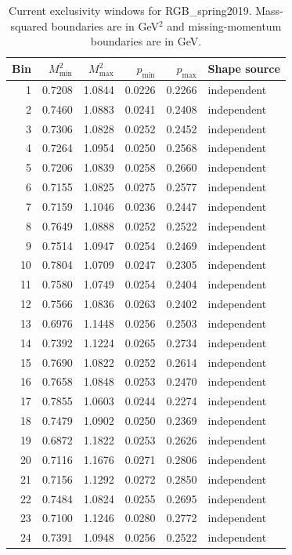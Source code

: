 \clearpage
\begin{longtable}{rrrrrl}
\caption{Current exclusivity windows for RGB\_spring2019. Mass-squared boundaries are in GeV$^2$ and missing-momentum boundaries are in GeV.}\\
\toprule Bin & $M^2_{\min}$ & $M^2_{\max}$ & $p_{\min}$ & $p_{\max}$ & Shape source\\\midrule\endhead
1 & 0.7208 & 1.0844 & 0.0226 & 0.2266 & independent\\
2 & 0.7460 & 1.0883 & 0.0241 & 0.2408 & independent\\
3 & 0.7306 & 1.0828 & 0.0252 & 0.2452 & independent\\
4 & 0.7264 & 1.0954 & 0.0250 & 0.2568 & independent\\
5 & 0.7206 & 1.0839 & 0.0258 & 0.2660 & independent\\
6 & 0.7155 & 1.0825 & 0.0275 & 0.2577 & independent\\
7 & 0.7159 & 1.1046 & 0.0236 & 0.2447 & independent\\
8 & 0.7649 & 1.0888 & 0.0252 & 0.2522 & independent\\
9 & 0.7514 & 1.0947 & 0.0254 & 0.2469 & independent\\
10 & 0.7804 & 1.0709 & 0.0247 & 0.2305 & independent\\
11 & 0.7580 & 1.0749 & 0.0254 & 0.2404 & independent\\
12 & 0.7566 & 1.0836 & 0.0263 & 0.2402 & independent\\
13 & 0.6976 & 1.1448 & 0.0256 & 0.2503 & independent\\
14 & 0.7392 & 1.1224 & 0.0265 & 0.2734 & independent\\
15 & 0.7690 & 1.0822 & 0.0252 & 0.2614 & independent\\
16 & 0.7658 & 1.0848 & 0.0253 & 0.2470 & independent\\
17 & 0.7855 & 1.0603 & 0.0244 & 0.2274 & independent\\
18 & 0.7479 & 1.0902 & 0.0250 & 0.2369 & independent\\
19 & 0.6872 & 1.1822 & 0.0253 & 0.2626 & independent\\
20 & 0.7116 & 1.1676 & 0.0271 & 0.2806 & independent\\
21 & 0.7156 & 1.1292 & 0.0272 & 0.2850 & independent\\
22 & 0.7484 & 1.0824 & 0.0255 & 0.2695 & independent\\
23 & 0.7100 & 1.1246 & 0.0280 & 0.2772 & independent\\
24 & 0.7391 & 1.0948 & 0.0256 & 0.2522 & independent\\
\bottomrule\end{longtable}
